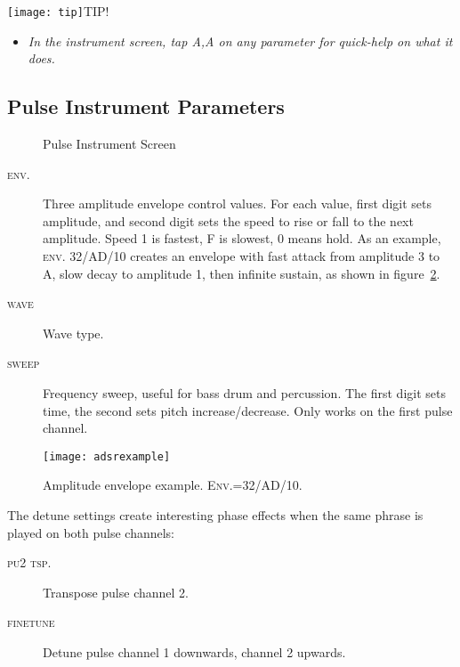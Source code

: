 \texttt{[image: tip]}TIP!
\begin{itemize}
	\item \textit{In the instrument screen, tap \textsc{A,A} on any parameter for quick-help on what it does.}
\end{itemize}

\subsection{Pulse Instrument Parameters}
\label{detune}

\begin{figure}[htpb]
	\begin{center}
	\end{center}
	\caption{Pulse Instrument Screen}
	\label{fig:instr-pulse}
\end{figure}

\label{pulse-adsr}
\begin{description}
	\item[\textsc{env.}] Three amplitude envelope control values. For each value, first digit sets amplitude, and second digit sets the speed to rise or fall to the next amplitude. Speed 1 is fastest, F is slowest, 0 means hold. As an example, \textsc{env.} 32/AD/10 creates an envelope with fast attack from amplitude 3 to A, slow decay to amplitude 1, then infinite sustain, as shown in figure~\ref{fig:adsrexample}.
	\item[\textsc{wave}] Wave type.
	\item[\textsc{sweep}] Frequency sweep, useful for bass drum and percussion. The first digit sets time, the second sets pitch increase/decrease. Only works on the first pulse channel. 
\end{description}

\begin{figure}[hbtp]
\centering
\texttt{[image: adsrexample]} 
	\caption{Amplitude envelope example. \textsc{Env.}=32/AD/10.}
\label{fig:adsrexample}
\end{figure}

The detune settings create interesting phase effects when the same phrase is played on both pulse channels:

\begin{description}
	\item[\textsc{pu2 tsp.}] Transpose pulse channel 2.
	\item[\textsc{finetune}] Detune pulse channel 1 downwards, channel 2 upwards.
\end{description}

